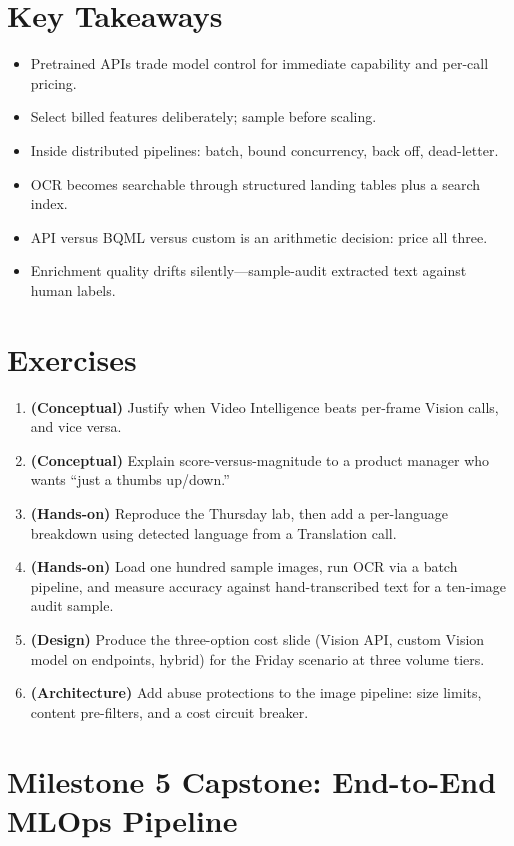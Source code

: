 \section*{Key Takeaways}
\begin{itemize}
    \item Pretrained APIs trade model control for immediate capability and per-call pricing.
    \item Select billed features deliberately; sample before scaling.
    \item Inside distributed pipelines: batch, bound concurrency, back off, dead-letter.
    \item OCR becomes searchable through structured landing tables plus a search index.
    \item API versus BQML versus custom is an arithmetic decision: price all three.
    \item Enrichment quality drifts silently---sample-audit extracted text against human labels.
\end{itemize}

\section{Exercises}
\begin{enumerate}
    \item \textbf{(Conceptual)} Justify when Video Intelligence beats per-frame Vision calls, and vice versa.
    \item \textbf{(Conceptual)} Explain score-versus-magnitude to a product manager who wants ``just a thumbs up/down.''
    \item \textbf{(Hands-on)} Reproduce the Thursday lab, then add a per-language breakdown using detected language from a Translation call.
    \item \textbf{(Hands-on)} Load one hundred sample images, run OCR via a batch pipeline, and measure accuracy against hand-transcribed text for a ten-image audit sample.
    \item \textbf{(Design)} Produce the three-option cost slide (Vision API, custom Vision model on endpoints, hybrid) for the Friday scenario at three volume tiers.
    \item \textbf{(Architecture)} Add abuse protections to the image pipeline: size limits, content pre-filters, and a cost circuit breaker.
\end{enumerate}

\section{Milestone 5 Capstone: End-to-End MLOps Pipeline}\label{sec:ch20-capstone}


